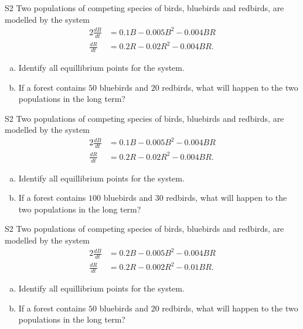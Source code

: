 \begin{problem}{S2}
Two populations of competing species of birds, bluebirds and redbirds, are modelled by the system
\begin{alignat*}{2}
\frac{dB}{dt} &= 0.1B - 0.005B^2 - 0.004BR \\
\frac{dR}{dt} & = 0.2R - 0.02R^2 - 0.004BR.
\end{alignat*}
\begin{enumerate}[(a)]
\item Identify all equillibrium points for the system.
\item If a forest contains \(50\) bluebirds and \(20\) redbirds, what will happen to the two populations in the long term?
\end{enumerate}
\end{problem}

\begin{problem}{S2}
Two populations of competing species of birds, bluebirds and redbirds, are modelled by the system
\begin{alignat*}{2}
\frac{dB}{dt} &= 0.1B - 0.005B^2 - 0.004BR \\
\frac{dR}{dt} & = 0.2R - 0.02R^2 - 0.004BR.
\end{alignat*}
\begin{enumerate}[(a)]
\item Identify all equillibrium points for the system.
\item If a forest contains \(100\) bluebirds and \(30\) redbirds, what will happen to the two populations in the long term?
\end{enumerate}
\end{problem}

\begin{problem}{S2}
Two populations of competing species of birds, bluebirds and redbirds, are modelled by the system
\begin{alignat*}{2}
\frac{dB}{dt} &= 0.2B - 0.005B^2 - 0.004BR \\
\frac{dR}{dt} & = 0.2R - 0.002R^2 - 0.01BR.
\end{alignat*}
\begin{enumerate}[(a)]
\item Identify all equillibrium points for the system.
\item If a forest contains \(50\) bluebirds and \(20\) redbirds, what will happen to the two populations in the long term?
\end{enumerate}
\end{problem}


